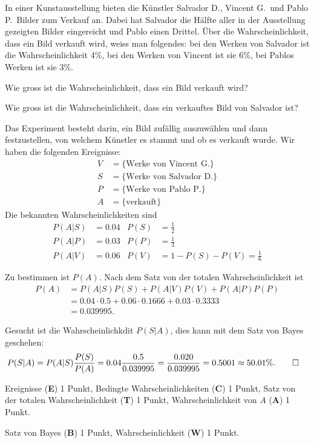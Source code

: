 In einer Kunstausstellung bieten die Künstler Salvador D., Vincent G.~und
Pablo P.~Bilder zum Verkauf an.
Dabei hat Salvador die Hälfte aller in der Ausstellung gezeigten
Bilder eingereicht und Pablo einen Drittel.
Über die Wahrscheinlichkeit, dass ein Bild verkauft wird, weiss
man folgendes: bei den Werken von Salvador ist die Wahrscheinlichkeit
4\%, bei den Werken von Vincent ist sie 6\%, bei Pablos Werken ist sie 3\%.
\begin{teilaufgaben}
\item Wie gross ist die Wahrscheinlichkeit, dass ein Bild verkauft wird?
\item Wie gross ist die Wahrscheinlichkeit, dass ein verkauftes
Bild von Salvador ist?
\end{teilaufgaben}

\begin{loesung}
Das Experiment besteht darin, ein Bild zufällig auszuwählen und dann
festzustellen, von welchem Künstler es stammt und ob es verkauft wurde.
Wir haben die folgenden Ereignisse:
\begin{align*}
V&=\{\text{Werke von Vincent~G.}\}\\
S&=\{\text{Werke von Salvador~D.}\}\\
P&=\{\text{Werke von Pablo~P.}\}\\
A&=\{\text{verkauft}\}
\end{align*}
Die bekannten Wahrscheinlichkeiten sind
\begin{align*}
P(A|S)&=0.04 & P(S)&=\frac12\\
P(A|P)&=0.03 & P(P)&=\frac13\\
P(A|V)&=0.06 & P(V)&=1-P(S)-P(V) = \frac16
\end{align*}
\begin{teilaufgaben}
\item
Zu bestimmen ist $P(A)$.
Nach dem Satz von der totalen Wahrscheinlichkeit ist
\begin{align*}
P(A)
&=
P(A|S)P(S)
+
P(A|V)P(V)
+
P(A|P)P(P)
\\
&=
0.04\cdot 0.5
+
0.06\cdot 0.1666
+
0.03\cdot 0.3333
\\
&=0.039995.
\end{align*}
\item
Gesucht ist die Wahrscheinlichkdit $P(S|A)$, dies kann mit dem 
Satz von Bayes geschehen:
\begin{align*}
P(S|A)
&=
P(A|S)\frac{P(S)}{P(A)}
=
0.04\frac{0.5}{0.039995}
=
\frac{0.020}{0.039995}
=
0.5001
\approx
50.01\%.
\qedhere
\end{align*}
\end{teilaufgaben}
\end{loesung}

\begin{bewertung}
\begin{teilaufgaben}
\item
Ereignisse ({\bf E})  1 Punkt,
Bedingte Wahrscheinlichkeiten ({\bf C}) 1 Punkt,
Satz von der totalen Wahrscheinlichkeit ({\bf T}) 1 Punkt,
Wahrscheinlichkeit von $A$ ({\bf A}) 1 Punkt.
\item
Satz von Bayes ({\bf B}) 1 Punkt,
Wahrscheinlichkeit ({\bf W}) 1 Punkt.
\end{teilaufgaben}
\end{bewertung}
